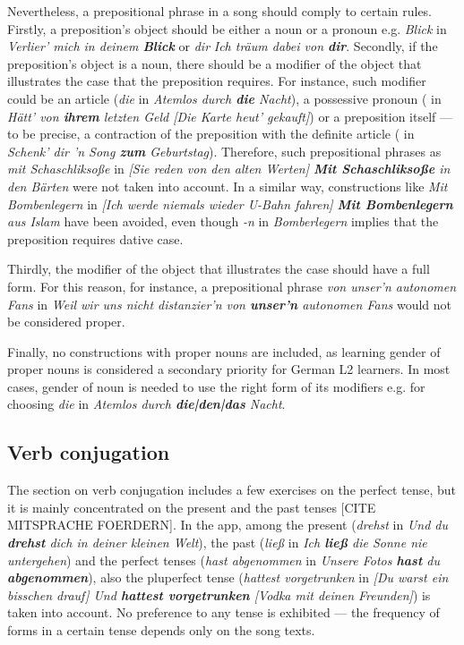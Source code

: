Nevertheless, a prepositional phrase in a song should comply to certain rules. Firstly, a preposition's object should be either a noun or a pronoun e.g. \textit{Blick} in \textit{Verlier' mich in deinem \textbf{Blick}} or \textit{dir} \textit{Ich träum dabei von \textbf{dir}}. 
Secondly, if the preposition's object is a noun, there should be a modifier of the object that illustrates the case that the preposition requires. For instance, such modifier could be an article (\textit{die} in \textit{Atemlos durch \textbf{die} Nacht}), a possessive pronoun ( in \textit{Hätt' von \textbf{ihrem} letzten Geld [Die Karte heut' gekauft]}) or a preposition itself --- to be precise, a contraction of the preposition with the definite article ( in \textit{Schenk' dir 'n Song \textbf{zum} Geburtstag}). Therefore, such prepositional phrases as \textit{mit Schaschliksoße} in \textit{[Sie reden von den alten Werten] \textbf{Mit Schaschliksoße} in den Bärten} were not taken into account. In a similar way, constructions like \textit{Mit Bombenlegern} in \textit{[Ich werde niemals wieder U-Bahn fahren] \textbf{Mit Bombenlegern} aus Islam} have been avoided, even though \textit{-n} in \textit{Bomberlegern} implies that the preposition requires dative case.

Thirdly, the modifier of the object that illustrates the case should have a full form. For this reason, for instance, a prepositional phrase \textit{von unser'n autonomen Fans} in \textit{Weil wir uns nicht distanzier'n von \textbf{unser'n} autonomen Fans} would not be considered proper.

Finally, no constructions with proper nouns are included, as learning gender of proper nouns is considered a secondary priority for German L2 learners. In most cases, gender of noun is needed to use the right form of its modifiers e.g. for choosing \textit{die} in \textit{Atemlos durch \textbf{die|den|das} Nacht}.

\subsection{Verb conjugation}

The section on verb conjugation includes a few exercises on the perfect tense, but it is mainly concentrated on the present and the past tenses [CITE MITSPRACHE FOERDERN]. In the app, among the present (\textit{drehst} in \textit{Und du \textbf{drehst} dich in deiner kleinen Welt}), the past (\textit{ließ} in \textit{Ich \textbf{ließ} die Sonne nie untergehen}) and the perfect tenses (\textit{hast abgenommen} in \textit{Unsere Fotos \textbf{hast} du \textbf{abgenommen}}), also the pluperfect tense (\textit{hattest vorgetrunken} in \textit{[Du warst ein bisschen drauf] Und \textbf{hattest vorgetrunken} [Vodka mit deinen Freunden]}) is taken into account. No preference to any tense is exhibited --- the frequency of forms in a certain tense depends only on the song texts. 


